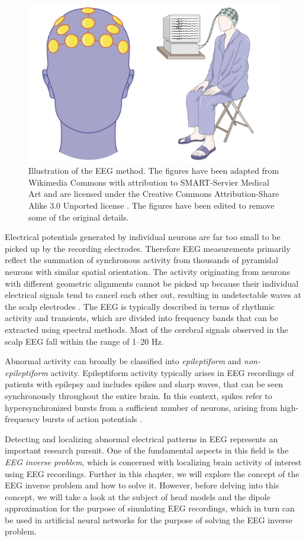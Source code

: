 \documentclass[a4paper, UKenglish, 11pt]{uiomaster}
\begin{document}
\begin{figure}[!htb]
    \centering
    \includegraphics[width=0.6\linewidth]{figures/new_eeg_wiki.jpg}
    \caption{Illustration of the EEG method. The figures have been adapted from Wikimedia Commons with attribution to SMART-Servier Medical Art and are licensed under the Creative Commons Attribution-Share Alike 3.0 Unported license \cite{EEG_head} \cite{EEG_full_body}. The figures have been edited to remove some of the original details.}
    \label{fig:EEG}
\end{figure}

Electrical potentials generated by individual neurons are far too small to be picked up by the recording electrodes. Therefore EEG measurements primarily reflect the summation of synchronous activity from thousands of pyramidal neurons with similar spatial orientation. The activity originating from neurons with different geometric alignments cannot be picked up because their individual electrical signals tend to cancel each other out, resulting in undetectable waves at the scalp electrodes \cite{bromfield2006introduction}. The EEG is typically described in terms of rhythmic activity and transients, which are divided into frequency bands that can be extracted using spectral methods. Most of the cerebral signals observed in the scalp EEG fall within the range of 1–20 Hz.

Abnormal activity can broadly be classified into \emph{epileptiform} and \emph{non-epileptiform} activity. Epileptiform activity typically arises in EEG recordings of patients with epilepsy and includes spikes and sharp waves, that can be seen synchronously throughout the entire brain. In this context, spikes refer to hypersynchronized bursts from a sufficient number of neurons, arising from high-frequency bursts of action potentials \cite{bromfield2006introduction}.

Detecting and localizing abnormal electrical patterns in EEG represents an important research pursuit. One of the fundamental aspects in this field is the \emph{EEG inverse problem}, which is concerned with localizing brain activity of interest using EEG recordings. Further in this chapter, we will explore the concept of the EEG inverse problem and how to solve it. However, before delving into this concept, we will take a look at the subject of head models and the dipole approximation for the purpose of simulating EEG recordings, which in turn can be used in artificial neural networks for the purpose of solving the EEG inverse problem.
\end{document}
